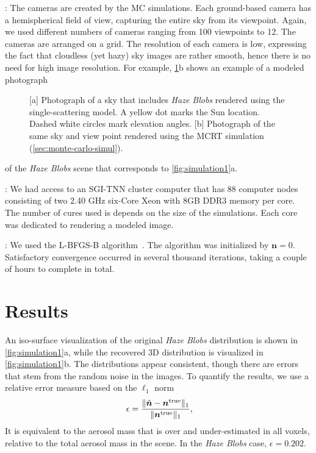 \documentclass[10pt,letterpaper]{article}
\newcommand{\yoavcomment}[1]{}
\renewcommand{\yoavcomment}[1]{#1} %
\begin{document}
: The cameras are created by the MC simulations.
Each ground-based camera has a hemispherical field of view, capturing
the entire sky from its viewpoint. Again, we used different numbers of
cameras ranging from 100 viewpoints to 12. The cameras are arranged on
a grid.  The resolution of each camera is low, expressing the fact
that cloudless (yet hazy) sky images are rather smooth, hence there is
no need for high image resolution.  For example,
\cref{fig:simulation-results1}b shows an example of a modeled
photograph
\begin{figure}
  \centering
  \yoavcomment{\def\svgwidth{0.7\columnwidth}}
  \caption{\small [a] Photograph of a sky that includes {\em Haze
      Blobs} rendered using the single-scattering model.  A yellow dot
    marks the Sun location. Dashed white circles mark elevation
    angles.  [b] Photograph of the same sky and view point rendered
    using the MCRT simulation (\cref{sec:monte-carlo-simul}).}
  \label{fig:simulation-results1}
\end{figure}
of the {\em Haze Blobs} scene that corresponds to
\cref{fig:simulation1}a.

: We had access to an SGI-TNN cluster computer
that has 88 computer nodes consisting of two 2.40 GHz six-Core Xeon
with 8GB DDR3 memory per core. The number of cures used is depends
on the size of the simulations. Each core was dedicated to rendering a
modeled image.

: We used the L-BFGS-B
algorithm~\cite{BFGS}. The algorithm was initialized by ${\bm
  n}=0$. Satisfactory convergence occurred in several thousand
iterations, taking a couple of hours to complete in total.


\section{Results}
\label{sec:optimization-results}

An iso-surface visualization of the original {\em Haze Blobs}
distribution is shown in \cref{fig:simulation1}a, while the recovered
3D distribution is visualized in \cref{fig:simulation1}b. The
distributions appear consistent, though there are errors that stem
from the random noise in the images. To quantify the results, we use a
relative error measure based on the $\ell_1$ norm
\begin{equation}
  \label{eq:ndiff}
  \epsilon=\frac{\| \hat{\bm n}  - {\bm n}^{\rm true} \|_1}
  {\| {\bm n}^{\rm true} \|_1} ,
  \hspace{-0.05cm}
\end{equation}
It is equivalent to the aerosol mass that is over and under-estimated
in all voxels, relative to the total aerosol mass in the scene.  In
the {\em Haze Blobs} case, $\epsilon=0.202$.
\end{document}
